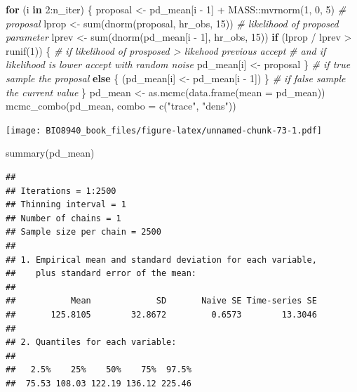 \documentclass[
  12pt,
]{book}
\newenvironment{Shaded}{\begin{snugshade}}{\end{snugshade}}
\newcommand{\AttributeTok}[1]{\textcolor[rgb]{0.77,0.63,0.00}{#1}}
\newcommand{\CommentTok}[1]{\textcolor[rgb]{0.56,0.35,0.01}{\textit{#1}}}
\newcommand{\ControlFlowTok}[1]{\textcolor[rgb]{0.13,0.29,0.53}{\textbf{#1}}}
\newcommand{\DecValTok}[1]{\textcolor[rgb]{0.00,0.00,0.81}{#1}}
\newcommand{\FunctionTok}[1]{\textcolor[rgb]{0.00,0.00,0.00}{#1}}
\newcommand{\NormalTok}[1]{#1}
\newcommand{\OtherTok}[1]{\textcolor[rgb]{0.56,0.35,0.01}{#1}}
\newcommand{\SpecialCharTok}[1]{\textcolor[rgb]{0.00,0.00,0.00}{#1}}
\newcommand{\StringTok}[1]{\textcolor[rgb]{0.31,0.60,0.02}{#1}}
\begin{document}
\begin{Shaded}
\begin{Highlighting}[]
\ControlFlowTok{for}\NormalTok{ (i }\ControlFlowTok{in} \DecValTok{2}\SpecialCharTok{:}\NormalTok{n\_iter) \{}
\NormalTok{  proposal }\OtherTok{\textless{}{-}}\NormalTok{ pd\_mean[i }\SpecialCharTok{{-}} \DecValTok{1}\NormalTok{] }\SpecialCharTok{+}\NormalTok{ MASS}\SpecialCharTok{::}\FunctionTok{mvrnorm}\NormalTok{(}\DecValTok{1}\NormalTok{, }\DecValTok{0}\NormalTok{, }\DecValTok{5}\NormalTok{) }\CommentTok{\# proposal}
\NormalTok{  lprop }\OtherTok{\textless{}{-}} \FunctionTok{sum}\NormalTok{(}\FunctionTok{dnorm}\NormalTok{(proposal, hr\_obs, }\DecValTok{15}\NormalTok{)) }\CommentTok{\# likelihood of proposed parameter}
\NormalTok{  lprev }\OtherTok{\textless{}{-}} \FunctionTok{sum}\NormalTok{(}\FunctionTok{dnorm}\NormalTok{(pd\_mean[i }\SpecialCharTok{{-}} \DecValTok{1}\NormalTok{], hr\_obs, }\DecValTok{15}\NormalTok{))}
  \ControlFlowTok{if}\NormalTok{ (lprop }\SpecialCharTok{/}\NormalTok{ lprev }\SpecialCharTok{\textgreater{}} \FunctionTok{runif}\NormalTok{(}\DecValTok{1}\NormalTok{)) \{ }\CommentTok{\# if likelihood of prosposed \textgreater{} likehood previous accept }
  \CommentTok{\# and if likelihood is lower accept with random noise}
\NormalTok{    pd\_mean[i] }\OtherTok{\textless{}{-}}\NormalTok{ proposal}
\NormalTok{  \} }\CommentTok{\# if true sample the proposal}
  \ControlFlowTok{else}\NormalTok{ \{}
\NormalTok{    (pd\_mean[i] }\OtherTok{\textless{}{-}}\NormalTok{ pd\_mean[i }\SpecialCharTok{{-}} \DecValTok{1}\NormalTok{])}
\NormalTok{  \} }\CommentTok{\# if false sample the current value}
\NormalTok{\}}
\NormalTok{pd\_mean }\OtherTok{\textless{}{-}} \FunctionTok{as.mcmc}\NormalTok{(}\FunctionTok{data.frame}\NormalTok{(}\AttributeTok{mean =}\NormalTok{ pd\_mean))}
\FunctionTok{mcmc\_combo}\NormalTok{(pd\_mean, }\AttributeTok{combo =} \FunctionTok{c}\NormalTok{(}\StringTok{"trace"}\NormalTok{, }\StringTok{"dens"}\NormalTok{))}
\end{Highlighting}
\end{Shaded}

\texttt{[image: BIO8940\_book\_files/figure-latex/unnamed-chunk-73-1.pdf]}

\begin{Shaded}
\begin{Highlighting}[]
\FunctionTok{summary}\NormalTok{(pd\_mean)}
\end{Highlighting}
\end{Shaded}

\begin{verbatim}
## 
## Iterations = 1:2500
## Thinning interval = 1 
## Number of chains = 1 
## Sample size per chain = 2500 
## 
## 1. Empirical mean and standard deviation for each variable,
##    plus standard error of the mean:
## 
##           Mean             SD       Naive SE Time-series SE 
##       125.8105        32.8672         0.6573        13.3046 
## 
## 2. Quantiles for each variable:
## 
##   2.5%    25%    50%    75%  97.5% 
##  75.53 108.03 122.19 136.12 225.46
\end{verbatim}
\end{document}
